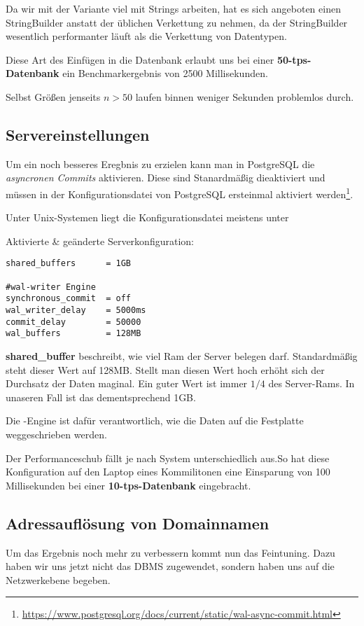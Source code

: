 Da wir mit der Variante viel mit Strings arbeiten, hat es sich angeboten einen
StringBuilder anstatt der üblichen Verkettung zu nehmen, da der StringBuilder
wesentlich performanter läuft als die Verkettung von Datentypen.

Diese Art des Einfügen in die Datenbank erlaubt uns bei einer
\textbf{50-tps-Datenbank} ein Benchmarkergebnis von 2500 Millisekunden.

Selbst Größen jenseits $n > 50$ laufen binnen weniger Sekunden problemlos durch.

\subsection{Servereinstellungen}

Um ein noch besseres Eregbnis zu erzielen kann man in PostgreSQL die
\textit{asyncronen Commits} aktivieren. Diese sind Stanardmäßig dieaktiviert und
müssen in der Konfigurationsdatei von PostgreSQL ersteinmal aktiviert
werden\footnote{\url{https://www.postgresql.org/docs/current/static/wal-async-commit.html}}.

Unter Unix-Systemen liegt die Konfigurationsdatei meistens unter \newline
{}

Aktivierte \& geänderte Serverkonfiguration:
\begin{lstlisting}[title={Veränderte Serverkonfiguration}]
shared_buffers		= 1GB

#wal-writer Engine
synchronous_commit	= off
wal_writer_delay	= 5000ms
commit_delay		= 50000
wal_buffers			= 128MB
\end{lstlisting}

\textbf{shared\_buffer} beschreibt, wie viel Ram der Server belegen darf.
Standardmäßig steht dieser Wert auf 128MB. Stellt man diesen Wert hoch erhöht
sich der Durchsatz der Daten maginal. Ein guter Wert ist immer $1/4$ des
Server-Rams. In unaseren  Fall ist das dementsprechend 1GB.

Die -Engine ist dafür verantwortlich, wie die Daten auf die
Festplatte weggeschrieben werden.

Der Performanceschub fällt je nach System unterschiedlich aus.So hat diese
Konfiguration auf den Laptop eines Kommilitonen eine Einsparung von 100
Millisekunden bei einer \textbf{10-tps-Datenbank} eingebracht.

\subsection{Adressauflösung von Domainnamen}
Um das Ergebnis noch mehr zu verbessern kommt nun das Feintuning. Dazu
haben wir uns jetzt nicht das DBMS zugewendet, sondern haben uns auf die
Netzwerkebene begeben.

